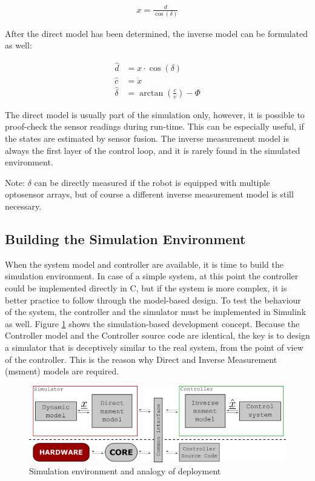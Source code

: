 \begin{align}
    x = \frac{d}{\cos(\delta)}
\end{align}

After the direct model has been determined, the inverse model can be formulated as well:

\begin{align}
    \hat{d} &= x \cdot \cos(\delta) \\
    \hat{c} &=\dot{x} \\
    \hat{\delta} &= \arctan \left(\frac{c}{v}\right) - \Phi
\end{align}

The direct model is usually part of the simulation only, however, it is possible to proof-check the sensor readings during run-time. This can be especially useful, if the states are estimated by sensor fusion. The inverse measurement model is always the first layer of the control loop, and it is rarely found in the simulated environment.

Note: $\delta$ can be directly measured if the robot is equipped with multiple optosensor arrays, but of course a different inverse measurement model is still necessary.

\subsection{Building the Simulation Environment}

When the system model and controller are available, it is time to build the simulation environment. In case of a simple system, at this point the controller could be implemented directly in \textsf{C}, but if the system is more complex, it is better practice to follow through the model-based design. To test the behaviour of the system, the controller and the simulator must be implemented in \textsf{Simulink} as well. Figure \ref{fig:simenvironment} shows the simulation-based development concept. Because the Controller model and the Controller source code are identical, the key is to design a simulator that is deceptively similar to the real system, from the point of view of the controller. This is the reason why Direct and Inverse Measurement (msment) models are required.

\begin{figure}[!ht]
    \centering
    \includegraphics[width=0.7\linewidth]{img/simenvironment}
    \centering
    \caption{Simulation environment and analogy of deployment}
    \label{fig:simenvironment}
\end{figure}

